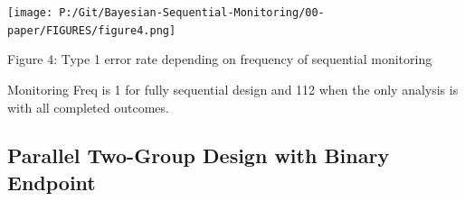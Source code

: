 \documentclass[12pt]{article}
\begin{document}
\begin{center}
\texttt{[image: P:/Git/Bayesian-Sequential-Monitoring/00-paper/FIGURES/figure4.png]}

Figure 4: Type 1 error rate depending on frequency of sequential monitoring
\end{center}
Monitoring Freq is 1 for fully sequential design and 112 when the only analysis is with all completed outcomes.
\subsection{Parallel Two-Group Design with Binary Endpoint}
\end{document}
